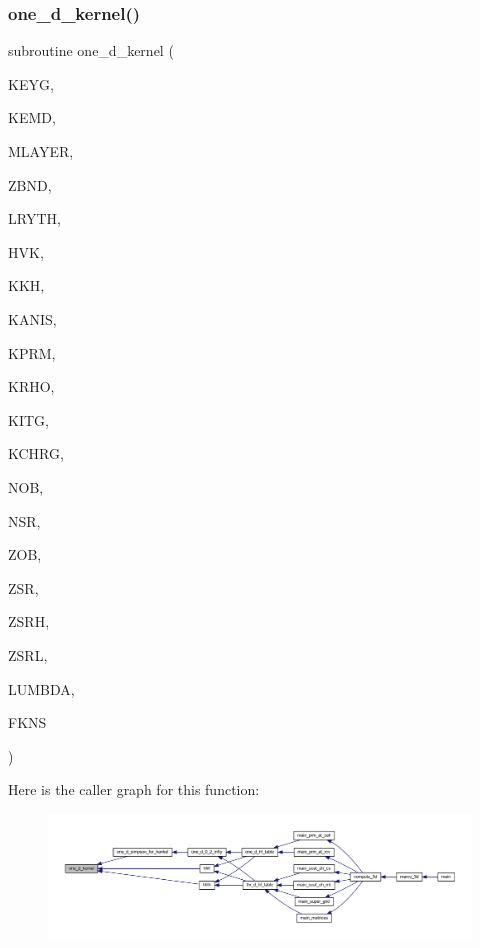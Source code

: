 \subsubsection{\texorpdfstring{one\+\_\+d\+\_\+kernel()}{one\_d\_kernel()}}
{\footnotesize\ttfamily subroutine one\+\_\+d\+\_\+kernel (\begin{DoxyParamCaption}\item[{integer, intent(in)}]{K\+E\+YG,  }\item[{integer, intent(in)}]{K\+E\+MD,  }\item[{integer, intent(in)}]{M\+L\+A\+Y\+ER,  }\item[{real, dimension(0\+:mlayer), intent(in)}]{Z\+B\+ND,  }\item[{real, dimension(mlayer), intent(in)}]{L\+R\+Y\+TH,  }\item[{real, dimension(0\+:mlayer), intent(in)}]{H\+VK,  }\item[{complex, dimension(0\+:mlayer), intent(in)}]{K\+KH,  }\item[{integer, intent(in)}]{K\+A\+N\+IS,  }\item[{integer, intent(in)}]{K\+P\+RM,  }\item[{integer, intent(in)}]{K\+R\+HO,  }\item[{integer, intent(in)}]{K\+I\+TG,  }\item[{integer, intent(in)}]{K\+C\+H\+RG,  }\item[{integer, intent(in)}]{N\+OB,  }\item[{integer, intent(in)}]{N\+SR,  }\item[{real, intent(in)}]{Z\+OB,  }\item[{real, intent(in)}]{Z\+SR,  }\item[{real, intent(in)}]{Z\+S\+RH,  }\item[{real, intent(in)}]{Z\+S\+RL,  }\item[{real, intent(in)}]{L\+U\+M\+B\+DA,  }\item[{complex, dimension(11), intent(out)}]{F\+K\+NS }\end{DoxyParamCaption})}

Here is the caller graph for this function\+:
\nopagebreak
\begin{figure}[H]
\begin{center}
\leavevmode
\includegraphics[width=350pt]{Marco_8f90_a9d38006ae4142553da9eed59f368bed7_icgraph}
\end{center}
\end{figure}
\mbox{\label{Marco_8f90_a74c7c00c978f674115ec54ae3c5f1870}} 

